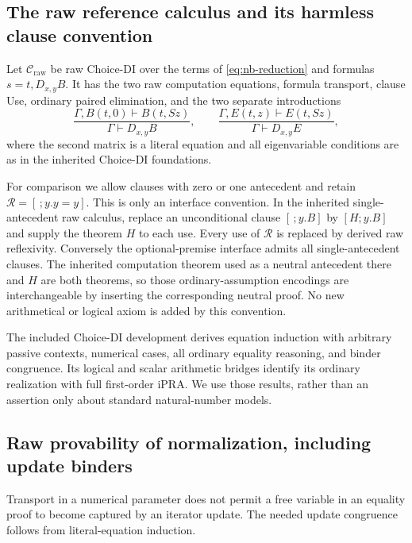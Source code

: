 \documentclass[11pt,a4paper]{article}
\theoremstyle{definition}\newtheorem{definition}[theorem]{Definition}
\theoremstyle{remark}\newtheorem{remark}[theorem]{Remark}
\begin{document}
\subsection{The raw reference calculus and its harmless clause convention}

Let $\mathcal C_{\mathrm{raw}}$ be raw Choice-DI over the terms of
\eqref{eq:nb-reduction} and formulas $s=t,D_{x,y}B$. It has the two raw
computation equations, formula transport, clause Use, ordinary paired
elimination, and the two separate introductions
\[
 \frac{\Gamma,B(t,0)\vdash B(t,Sz)}{\Gamma\vdash D_{x,y}B},
 \qquad
 \frac{\Gamma,E(t,z)\vdash E(t,Sz)}{\Gamma\vdash D_{x,y}E},
 \tag{Raw introductions}\label{eq:nb-raw-intro}
\]
where the second matrix is a literal equation and all eigenvariable
conditions are as in the inherited Choice-DI foundations.

For comparison we allow clauses with zero or one antecedent and retain
$\mathcal R=[\,;y.y=y]$. This is only an interface convention. In the
inherited single-antecedent raw calculus, replace an unconditional clause
$[\,;y.B]$ by $[H;y.B]$ and supply the theorem $H$ to each use.
Every use of $\mathcal R$ is replaced by derived raw reflexivity.
Conversely the optional-premise interface admits all single-antecedent
clauses. The inherited computation theorem used as a neutral antecedent
there and $H$ are both theorems, so those ordinary-assumption encodings
are interchangeable by inserting the corresponding neutral proof.
No new arithmetical or logical axiom is added by this convention.

The included Choice-DI development derives equation induction with
arbitrary passive contexts, numerical cases, all ordinary equality
reasoning, and binder congruence. Its logical and scalar arithmetic
bridges identify its ordinary realization with full first-order iPRA.
We use those results, rather than an assertion only about standard
natural-number models.

\subsection{Raw provability of normalization, including update binders}

Transport in a numerical parameter does not permit a free variable in
an equality proof to become captured by an iterator update. The needed
update congruence follows from literal-equation induction.
\end{document}

